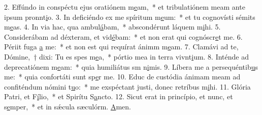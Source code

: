 2. Effúndo in conspéctu ejus oratiónem m\uline{e}am,~* et tribulatiónem meam ante ipsum pronnt\uline{i}o.
3. In deficiéndo ex me spíritum m\uline{e}um:~* et tu cognovísti sémits m\uline{e}as.
4. In via hac, qua ambul\uline{á}bam,~* abscondérunt láquem m\uline{i}hi.
5. Considerábam ad déxteram, et vid\uline{é}bam:~* et non erat qui cognóscr\uline{e}t me.
6. Périit fuga \uline{a} me:~* et non est qui requírat ánimm m\uline{e}am.
7. Clamávi ad te, Dómine,~† dixi: Tu es spes m\uline{e}a,~* pórtio mea in terra vivnt\uline{i}um.
8. Inténde ad deprecatiónem m\uline{e}am:~* quia humiliátus sm n\uline{i}mis.
9. Líbera me a persequéntib\uline{u}s me:~* quia confortáti sunt sp\uline{e}r me.
10. Educ de custódia ánimam meam ad confiténdum nómini t\uline{u}o:~* me exspéctant justi, donec retríbus m\uline{i}hi.
11. Glória Patri, et F\uline{í}lio,~* et Spirítu S\uline{a}ncto.
12. Sicut erat in princípio, et nunc, et s\uline{e}mper,~* et in sǽcula sæculórm. \uline{A}men.
